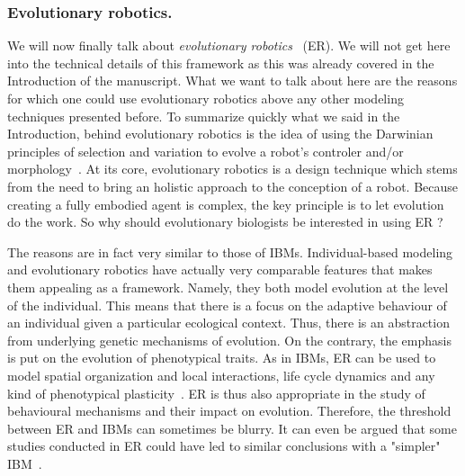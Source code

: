     \subsubsection{Evolutionary robotics.} We will now finally talk about \emph{evolutionary robotics}~\parencite{Nolfi2000, Doncieux2015a} (ER). We will not get here into the technical details of this framework as this was already covered in the Introduction of the manuscript. What we want to talk about here are the reasons for which one could use evolutionary robotics above any other modeling techniques presented before. To summarize quickly what we said in the Introduction, behind evolutionary robotics is the idea of using the Darwinian principles of selection and variation to evolve a robot's controler and/or morphology~\parencite{Floreano2010, Doncieux2014}. At its core, evolutionary robotics is a design technique which stems from the need to bring an holistic approach to the conception of a robot. Because creating a fully embodied agent is complex, the key principle is to let evolution do the work. So why should evolutionary biologists be interested in using ER ?

    The reasons are in fact very similar to those of IBMs. Individual-based modeling and evolutionary robotics have actually very comparable features that makes them appealing as a framework. Namely, they both model evolution at the level of the individual. This means that there is a focus on the adaptive behaviour of an individual given a particular ecological context. Thus, there is an abstraction from underlying genetic mechanisms of evolution. On the contrary, the emphasis is put on the evolution of phenotypical traits. As in IBMs, ER can be used to model spatial organization and local interactions, life cycle dynamics and any kind of phenotypical plasticity~\parencite{Mitri2012}. ER is thus also appropriate in the study of behavioural mechanisms and their impact on evolution. Therefore, the threshold between ER and IBMs can sometimes be blurry. It can even be argued that some studies conducted in ER could have led to similar conclusions with a "simpler" IBM~\parencite{Mitri2012}.

